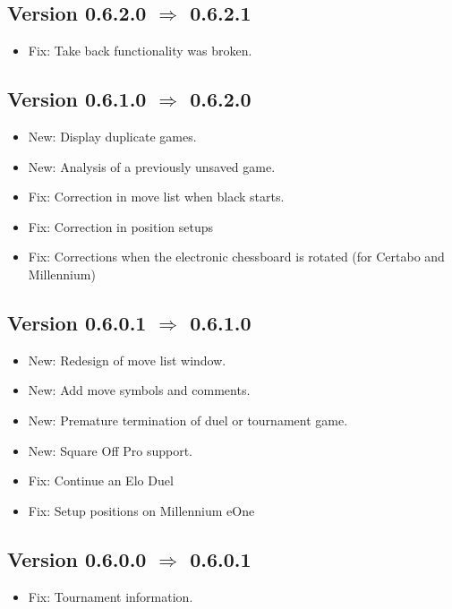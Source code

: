 \documentclass[11pt,a4paper]{article}
\begin{document}
\subsection*{Version 0.6.2.0 $\Rightarrow$  0.6.2.1}
\begin{itemize}
	\item Fix: Take back functionality was broken.
\end{itemize}

\subsection*{Version 0.6.1.0 $\Rightarrow$  0.6.2.0}
\begin{itemize}
	\item New: Display duplicate games.
	\item New: Analysis of a previously unsaved game.
	\item Fix: Correction in move list when black starts.
	\item Fix: Correction in position setups
	\item Fix: Corrections when the electronic chessboard is rotated (for Certabo and Millennium)
\end{itemize}

\subsection*{Version 0.6.0.1 $\Rightarrow$  0.6.1.0}
\begin{itemize}
    \item New: Redesign of move list window.
    \item New: Add move symbols and comments.
	\item New: Premature termination of duel or tournament game.
	\item New: Square Off Pro support.	
	\item Fix: Continue an Elo Duel
	\item Fix: Setup positions on Millennium eOne
\end{itemize}

\subsection*{Version 0.6.0.0 $\Rightarrow$  0.6.0.1}
\begin{itemize}
	\item Fix: Tournament information.		
\end{itemize}
\end{document}
